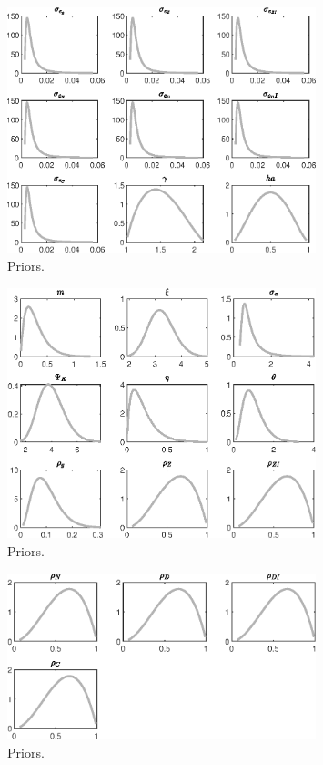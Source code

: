  
\begin{figure}[H]
\centering
\includegraphics[width=0.80\textwidth]{BRS_growth_KPR/graphs/BRS_growth_KPR_Priors1}
\caption{Priors.}\label{Fig:Priors:1}
\end{figure}
\begin{figure}[H]
\centering
\includegraphics[width=0.80\textwidth]{BRS_growth_KPR/graphs/BRS_growth_KPR_Priors2}
\caption{Priors.}\label{Fig:Priors:2}
\end{figure}
\begin{figure}[H]
\centering
\includegraphics[width=0.80\textwidth]{BRS_growth_KPR/graphs/BRS_growth_KPR_Priors3}
\caption{Priors.}\label{Fig:Priors:3}
\end{figure}
 
